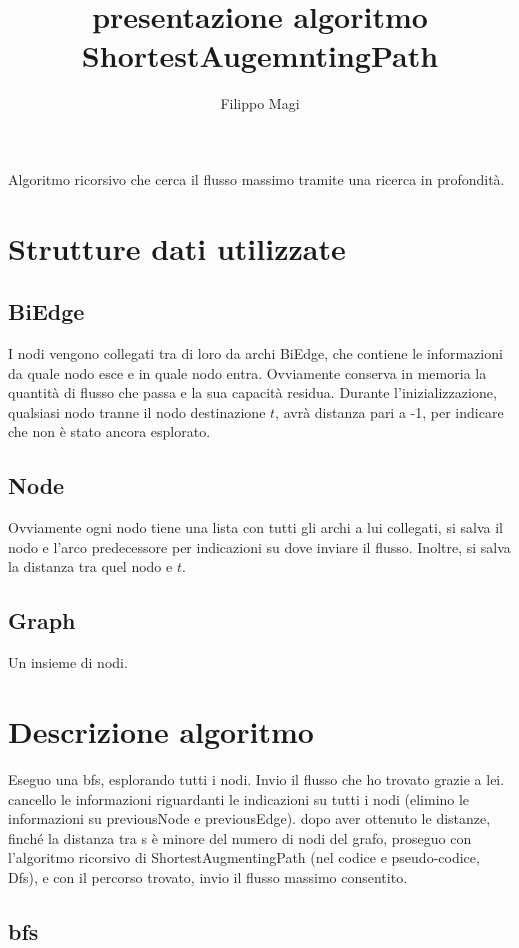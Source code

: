 \documentclass{article}
\title{presentazione algoritmo ShortestAugemntingPath}
\author{Filippo Magi }
\begin{document}
Algoritmo ricorsivo che cerca il flusso massimo tramite una ricerca in profondità.

\section{Strutture dati utilizzate}

\subsection{BiEdge}

I nodi vengono collegati tra di loro da archi BiEdge, che contiene le informazioni da quale nodo esce e in quale nodo entra.
Ovviamente conserva in memoria la quantità di flusso che passa e la sua capacità residua.
Durante l'inizializzazione, qualsiasi nodo tranne il nodo destinazione $t$, avrà distanza pari a -1, per indicare che non è stato ancora esplorato.

\subsection{Node}

Ovviamente ogni nodo tiene una lista con tutti gli archi a lui collegati, si salva il nodo e l'arco predecessore per indicazioni su dove inviare il flusso.
Inoltre, si salva la distanza tra quel nodo e $t$.

\subsection{Graph}

Un insieme di nodi.

\section{ Descrizione algoritmo}

Eseguo una bfs, esplorando tutti i nodi.
Invio il flusso che ho trovato grazie a lei.
cancello le informazioni riguardanti le indicazioni su tutti i nodi (elimino le informazioni su previousNode e previousEdge).
dopo aver ottenuto le distanze, finché la distanza tra s è minore del numero di nodi del grafo, proseguo con l'algoritmo ricorsivo di ShortestAugmentingPath (nel codice e pseudo-codice, Dfs), e con il percorso trovato, invio il flusso massimo consentito.

\subsection{bfs}
\end{document}
